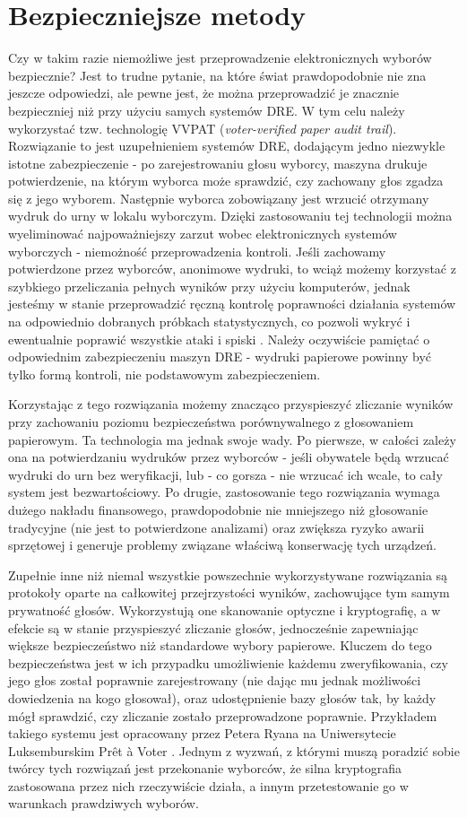 \documentclass[polish]{kbk}
\begin{document}
\section{Bezpieczniejsze metody}
Czy w takim razie niemożliwe jest przeprowadzenie elektronicznych wyborów bezpiecznie? Jest to trudne pytanie, na które świat prawdopodobnie nie zna jeszcze odpowiedzi, ale pewne jest, że można przeprowadzić je znacznie bezpieczniej niż przy użyciu samych systemów DRE. W tym celu należy wykorzystać tzw. technologię VVPAT (\textit{voter-verified paper audit trail}). Rozwiązanie to jest uzupełnieniem systemów DRE, dodającym jedno niezwykle istotne zabezpieczenie - po zarejestrowaniu głosu wyborcy, maszyna drukuje potwierdzenie, na którym wyborca może sprawdzić, czy zachowany głos zgadza się z jego wyborem. Następnie wyborca zobowiązany jest wrzucić otrzymany wydruk do urny w lokalu wyborczym. Dzięki zastosowaniu tej technologii można wyeliminować najpoważniejszy zarzut wobec elektronicznych systemów wyborczych - niemożność przeprowadzenia kontroli. Jeśli zachowamy potwierdzone przez wyborców, anonimowe wydruki, to wciąż możemy korzystać z szybkiego przeliczania pełnych wyników przy użyciu komputerów, jednak jesteśmy w stanie przeprowadzić ręczną kontrolę poprawności działania systemów na odpowiednio dobranych próbkach statystycznych, co pozwoli wykryć i ewentualnie poprawić wszystkie ataki i spiski \cite{schneier}. Należy oczywiście pamiętać o odpowiednim zabezpieczeniu maszyn DRE - wydruki papierowe powinny być tylko formą kontroli, nie podstawowym zabezpieczeniem.

Korzystając z tego rozwiązania możemy znacząco przyspieszyć zliczanie wyników przy zachowaniu poziomu bezpieczeństwa porównywalnego z głosowaniem papierowym. Ta technologia ma jednak swoje wady. Po pierwsze, w całości zależy ona na potwierdzaniu wydruków przez wyborców - jeśli obywatele będą wrzucać wydruki do urn bez weryfikacji, lub - co gorsza - nie wrzucać ich wcale, to cały system jest bezwartościowy. Po drugie, zastosowanie tego rozwiązania wymaga dużego nakładu finansowego, prawdopodobnie nie mniejszego niż głosowanie tradycyjne (nie jest to potwierdzone analizami) oraz zwiększa ryzyko awarii sprzętowej i generuje problemy związane właściwą konserwację tych urządzeń.

Zupełnie inne niż niemal wszystkie powszechnie wykorzystywane rozwiązania są protokoły oparte na całkowitej przejrzystości wyników, zachowujące tym samym prywatność głosów. Wykorzystują one skanowanie optyczne i kryptografię, a w efekcie są w stanie przyspieszyć zliczanie głosów, jednocześnie zapewniając większe bezpieczeństwo niż standardowe wybory papierowe. Kluczem do tego bezpieczeństwa jest w ich przypadku umożliwienie każdemu zweryfikowania, czy jego głos został poprawnie zarejestrowany (nie dając mu jednak możliwości dowiedzenia na kogo głosował), oraz udostępnienie bazy głosów tak, by każdy mógł sprawdzić, czy zliczanie zostało przeprowadzone poprawnie. Przykładem takiego systemu jest opracowany przez Petera Ryana na Uniwersytecie Luksemburskim Prêt à Voter \cite{bismark}. Jednym z wyzwań, z którymi muszą poradzić sobie twórcy tych rozwiązań jest przekonanie wyborców, że silna kryptografia zastosowana przez nich rzeczywiście działa, a innym przetestowanie go w warunkach prawdziwych wyborów.
\end{document}
